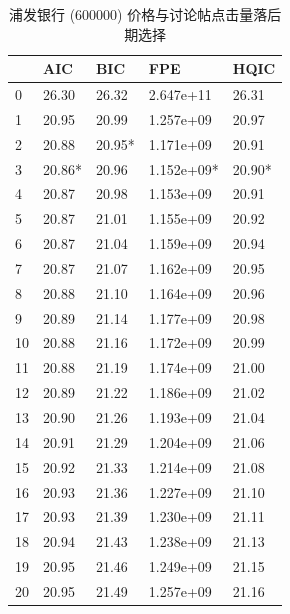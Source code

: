 \begin{table}
  \centering
  \caption{浦发银行 (600000) 价格与讨论帖点击量落后期选择}
  \label{price_click_count:1}
  \begin{tabularx}{0.75\textwidth}{XXXXX}
    \toprule
    & AIC & BIC & FPE & HQIC \\
    \midrule
    0 & 26.30 & 26.32 & 2.647e+11 & 26.31 \\
    1 & 20.95 & 20.99 & 1.257e+09 & 20.97 \\
    2 & 20.88 & 20.95* & 1.171e+09 & 20.91 \\
    3 & 20.86* & 20.96 & 1.152e+09* & 20.90* \\
    4 & 20.87 & 20.98 & 1.153e+09 & 20.91 \\
    5 & 20.87 & 21.01 & 1.155e+09 & 20.92 \\
    6 & 20.87 & 21.04 & 1.159e+09 & 20.94 \\
    7 & 20.87 & 21.07 & 1.162e+09 & 20.95 \\
    8 & 20.88 & 21.10 & 1.164e+09 & 20.96 \\
    9 & 20.89 & 21.14 & 1.177e+09 & 20.98 \\
    10 & 20.88 & 21.16 & 1.172e+09 & 20.99 \\
    11 & 20.88 & 21.19 & 1.174e+09 & 21.00 \\
    12 & 20.89 & 21.22 & 1.186e+09 & 21.02 \\
    13 & 20.90 & 21.26 & 1.193e+09 & 21.04 \\
    14 & 20.91 & 21.29 & 1.204e+09 & 21.06 \\
    15 & 20.92 & 21.33 & 1.214e+09 & 21.08 \\
    16 & 20.93 & 21.36 & 1.227e+09 & 21.10 \\
    17 & 20.93 & 21.39 & 1.230e+09 & 21.11 \\
    18 & 20.94 & 21.43 & 1.238e+09 & 21.13 \\
    19 & 20.95 & 21.46 & 1.249e+09 & 21.15 \\
    20 & 20.95 & 21.49 & 1.257e+09 & 21.16 \\
    \bottomrule
  \end{tabularx}
\end{table}

